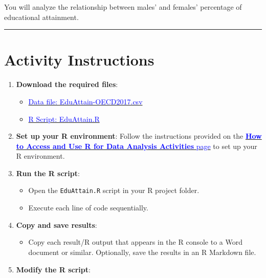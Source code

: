 \documentclass[oneside,openany]{book}
\providecommand{\tightlist}{%
  \setlength{\itemsep}{0pt}\setlength{\parskip}{0pt}}
\begin{document}
You will analyze the relationship between males' and females' percentage of educational attainment.

\begin{center}\rule{0.5\linewidth}{0.5pt}\end{center}

\section{Activity Instructions}\label{activity-instructions}

\begin{enumerate}
\def\labelenumi{\arabic{enumi}.}
\item
  \textbf{Download the required files}:

  \begin{itemize}
  \tightlist
  \item
    \href{https://raw.githubusercontent.com/aslemand/Data-Analysis-Activities/refs/heads/main/data/Activity_10/EduAttain-OECD2017.csv}{\textcolor{blue}{Data file: EduAttain-OECD2017.csv}}
  \item
    \href{https://raw.githubusercontent.com/aslemand/Data-Analysis-Activities/refs/heads/main/data/Activity_10/EduAttain.R}{\textcolor{blue}{R Script: EduAttain.R}}
  \end{itemize}
\item
  \textbf{Set up your R environment}:
  Follow the instructions provided on the \hyperref[how-to-set-up-r-for-data-analysis-activities]{\textcolor{blue}{\textbf{How to Access and Use R for Data Analysis Activities} page}} to set up your R environment.
\item
  \textbf{Run the R script}:

  \begin{itemize}
  \tightlist
  \item
    Open the \texttt{EduAttain.R} script in your R project folder.
  \item
    Execute each line of code sequentially.
  \end{itemize}
\item
  \textbf{Copy and save results}:

  \begin{itemize}
  \tightlist
  \item
    Copy each result/R output that appears in the R console to a Word document or similar. Optionally, save the results in an R Markdown file.
  \end{itemize}
\item
  \textbf{Modify the R script}:


\end{enumerate}
\end{document}

